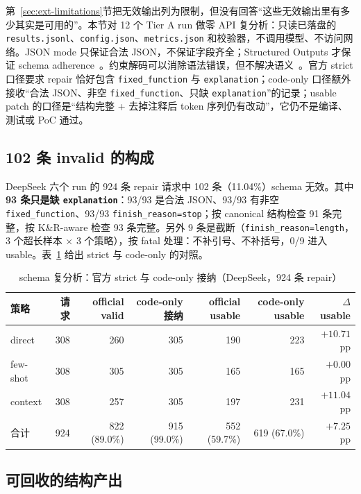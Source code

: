 \documentclass[conference]{IEEEtran}
\begin{document}
第~\ref{sec:ext-limitations}节把无效输出列为限制，但没有回答“这些无效输出里有多少其实是可用的”。本节对 12 个 Tier A run 做零 API 复分析：只读已落盘的 \texttt{results.jsonl}、\texttt{config.json}、\texttt{metrics.json} 和校验器，不调用模型、不访问网络。JSON mode 只保证合法 JSON，不保证字段齐全；Structured Outputs 才保证 schema adherence~\cite{geng2025jsonschemabench}。约束解码可以消除语法错误，但不解决语义~\cite{ugare2025syncode}。官方 strict 口径要求 repair 恰好包含 \texttt{fixed\_function} 与 \texttt{explanation}；code-only 口径额外接收“合法 JSON、非空 \texttt{fixed\_function}、只缺 \texttt{explanation}”的记录；usable patch 的口径是“结构完整 + 去掉注释后 token 序列仍有改动”，它仍不是编译、测试或 PoC 通过。

\subsection{102 条 invalid 的构成}

DeepSeek 六个 run 的 924 条 repair 请求中 102 条（11.04\%）schema 无效。其中 \textbf{93 条只是缺 \texttt{explanation}}：93/93 是合法 JSON、93/93 有非空 \texttt{fixed\_function}、93/93 \texttt{finish\_reason=stop}；按 canonical 结构检查 91 条完整，按 K\&R-aware 检查 93 条完整。另外 9 条是截断（\texttt{finish\_reason=length}，3 个超长样本 $\times$ 3 个策略），按 fatal 处理：不补引号、不补括号，0/9 进入 usable。表~\ref{tab:schema} 给出 strict 与 code-only 的对照。

\begin{table}[t]
\caption{schema 复分析：官方 strict 与 code-only 接纳（DeepSeek，924 条 repair）}
\label{tab:schema}
\centering
\scriptsize
\setlength{\tabcolsep}{3.6pt}
\begin{tabular}{@{}lrrrrrr@{}}
\toprule
策略 & 请求 & official valid & code-only 接纳 & official usable & code-only usable & $\Delta$ usable\\
\midrule
direct & 308 & 260 & 305 & 190 & 223 & $+10.71$ pp\\
few-shot & 308 & 305 & 305 & 165 & 165 & $+0.00$ pp\\
context & 308 & 257 & 305 & 197 & 231 & $+11.04$ pp\\
合计 & 924 & 822 (89.0\%) & 915 (99.0\%) & 552 (59.7\%) & 619 (67.0\%) & $+7.25$ pp\\
\bottomrule
\end{tabular}
\end{table}

\subsection{可回收的结构产出}
\end{document}
